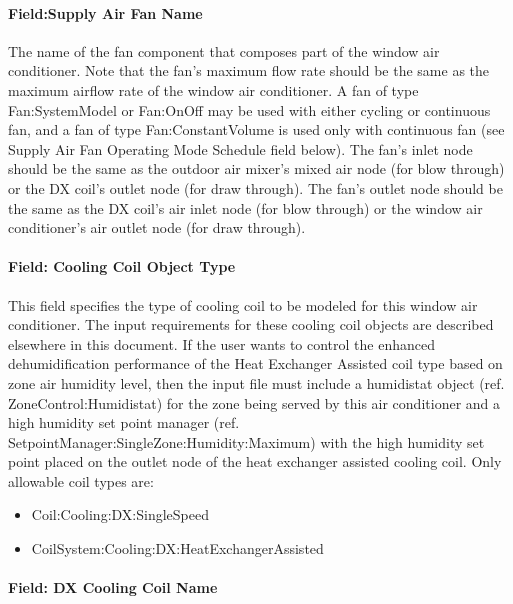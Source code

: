\paragraph{Field:Supply Air Fan Name}\label{fieldsupply-air-fan-name}

The name of the fan component that composes part of the window air conditioner. Note that the fan's maximum flow rate should be the same as the maximum airflow rate of the window air conditioner. A fan of type Fan:SystemModel or Fan:OnOff may be used with either cycling or continuous fan, and a fan of type Fan:ConstantVolume is used only with continuous fan (see Supply Air Fan Operating Mode Schedule field below). The fan's inlet node should be the same as the outdoor air mixer's mixed air node (for blow through) or the DX coil's outlet node (for draw through). The fan's outlet node should be the same as the DX coil's air inlet node (for blow through) or the window air conditioner's air outlet node (for draw through).

\paragraph{Field: Cooling Coil Object Type}\label{field-cooling-coil-object-type-2-001}

This field specifies the type of cooling coil to be modeled for this window air conditioner. The input requirements for these cooling coil objects are described elsewhere in this document. If the user wants to control the enhanced dehumidification performance of the Heat Exchanger Assisted coil type based on zone air humidity level, then the input file must include a humidistat object (ref. ZoneControl:Humidistat) for the zone being served by this air conditioner and a high humidity set point manager (ref. SetpointManager:SingleZone:Humidity:Maximum) with the high humidity set point placed on the outlet node of the heat exchanger assisted cooling coil. Only allowable coil types are:

\begin{itemize}
\item
  Coil:Cooling:DX:SingleSpeed
\item
  CoilSystem:Cooling:DX:HeatExchangerAssisted
\end{itemize}

\paragraph{Field: DX Cooling Coil Name}\label{field-dx-cooling-coil-name}

